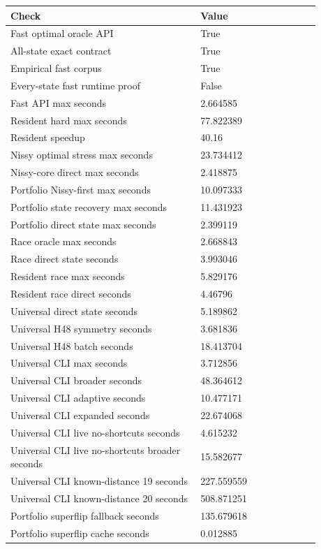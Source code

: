 {\small
\begin{tabular}{@{}p{0.54\linewidth}p{0.34\linewidth}@{}}
\hline
Check & Value \\
\hline
Fast optimal oracle API & True \\
All-state exact contract & True \\
Empirical fast corpus & True \\
Every-state fast runtime proof & False \\
Fast API max seconds & 2.664585 \\
Resident hard max seconds & 77.822389 \\
Resident speedup & 40.16 \\
Nissy optimal stress max seconds & 23.734412 \\
Nissy-core direct max seconds & 2.418875 \\
Portfolio Nissy-first max seconds & 10.097333 \\
Portfolio state recovery max seconds & 11.431923 \\
Portfolio direct state max seconds & 2.399119 \\
Race oracle max seconds & 2.668843 \\
Race direct state seconds & 3.993046 \\
Resident race max seconds & 5.829176 \\
Resident race direct seconds & 4.46796 \\
Universal direct state seconds & 5.189862 \\
Universal H48 symmetry seconds & 3.681836 \\
Universal H48 batch seconds & 18.413704 \\
Universal CLI max seconds & 3.712856 \\
Universal CLI broader seconds & 48.364612 \\
Universal CLI adaptive seconds & 10.477171 \\
Universal CLI expanded seconds & 22.674068 \\
Universal CLI live no-shortcuts seconds & 4.615232 \\
Universal CLI live no-shortcuts broader seconds & 15.582677 \\
Universal CLI known-distance 19 seconds & 227.559559 \\
Universal CLI known-distance 20 seconds & 508.871251 \\
Portfolio superflip fallback seconds & 135.679618 \\
Portfolio superflip cache seconds & 0.012885 \\

\end{tabular}}
